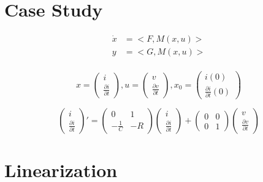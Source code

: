 \documentclass{article}
\begin{document}
\section{Case Study}

\begin{align}
    \dot{x} &= <F,M(x,u)> \\
    y &= <G,M(x,u)> \\
\end{align}

\begin{equation}
    x = 
    \begin{pmatrix}
    i \\
    \frac{\partial i}{\partial t}
    \end{pmatrix},
    u = 
    \begin{pmatrix}
    v \\
    \frac{\partial v}{\partial t}
    \end{pmatrix},
    x_0 =
    \begin{pmatrix}
    i(0) \\
    \frac{\partial i}{\partial t}(0)
    \end{pmatrix}
\end{equation}

\begin{equation}
     \begin{pmatrix}
    i \\
    \frac{\partial i}{\partial t}
    \end{pmatrix}' =
    \begin{pmatrix}
    0            &  1 \\
    -\frac{1}{C} & -R
    \end{pmatrix}
    \begin{pmatrix}
    i \\
    \frac{\partial i}{\partial t}
    \end{pmatrix}
    +
    \begin{pmatrix}
    0 & 0 \\
    0 & 1
    \end{pmatrix}
    \begin{pmatrix}
    v \\
    \frac{\partial v}{\partial t}
    \end{pmatrix}
\end{equation}

\section{Linearization}
\end{document}
